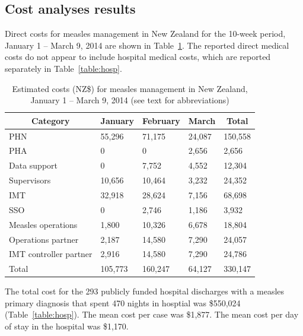 \documentclass{article}
\begin{document}
\subsection{Cost analyses results}
Direct costs for measles management in New Zealand for the 10-week period, January 1 -- March 9, 2014 are shown in  Table~\ref{table:direct}. The reported direct medical costs do not appear to include hospital medical costs, which are reported separately in Table~\ref{table:hosp}. 


\begin{table}
\caption{Estimated costs (NZ\$) for measles management in New Zealand, January 1 -- March 9, 2014 (see text for abbreviations)}
\begin{center}
\begin{tabular}{lllll}
\hline\hline
\multicolumn{1}{c}{Category}&\multicolumn{1}{c}{January}&\multicolumn{1}{c}{February}&\multicolumn{1}{c}{March}&\multicolumn{1}{c}{Total}\tabularnewline
\hline
PHN&55,296&71,175&24,087&150,558\tabularnewline
PHA&0&0&2,656&2,656\tabularnewline
Data support&0&7,752&4,552&12,304\tabularnewline
Supervisors&10,656&10,464&3,232&24,352\tabularnewline
IMT&32,918&28,624&7,156&68,698\tabularnewline
SSO&0&2,746&1,186&3,932\tabularnewline
Measles operations&1,800&10,326&6,678&18,804\tabularnewline
Operations partner&2,187&14,580&7,290&24,057\tabularnewline
IMT controller partner&2,916&14,580&7,290&24,786\tabularnewline
Total&105,773&160,247&64,127&330,147\tabularnewline
\hline
\end{tabular}\end{center}\label{table:direct}
\end{table}

The total cost for the 293 publicly funded hospital discharges with a measles primary diagnosis that spent 470 nights in hosptial was \$550,024 (Table~\ref{table:hosp}). The mean cost per case was \$1,877. The mean cost per day of stay in the hospital was \$1,170.
\end{document}
